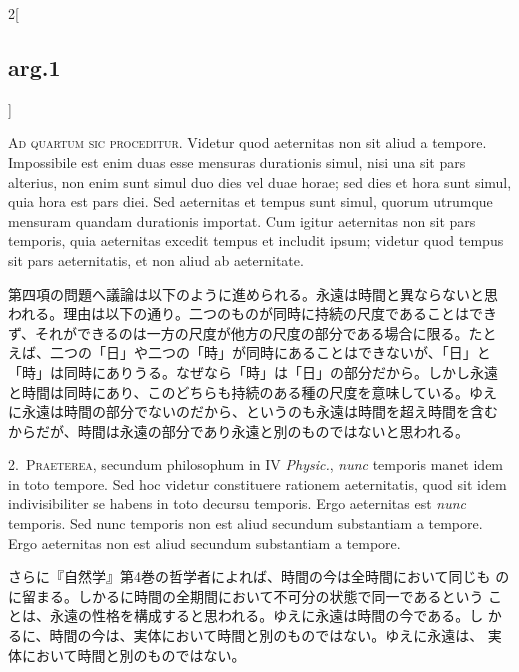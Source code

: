 \documentclass[paper=a4paper,fontsize=10pt,jafontsize=9pt,titlepage]{jlreq}
\begin{document}
{}
\setcounter{section}{4}
\setcounter{subsection}{0}

\begin{paracol}{2}[\subsection{arg.1}]

{\huge A}{\scshape d quartum sic proceditur}. Videtur quod aeternitas non sit aliud a
tempore. Impossibile est enim duas esse mensuras durationis simul, nisi
una sit pars alterius, non enim sunt simul duo dies vel duae horae; sed
dies et hora sunt simul, quia hora est pars diei. Sed aeternitas et
tempus sunt simul, quorum utrumque mensuram quandam durationis
importat. Cum igitur aeternitas non sit pars temporis, quia aeternitas
excedit tempus et includit ipsum; videtur quod tempus sit pars
aeternitatis, et non aliud ab aeternitate.

\switchcolumn

第四項の問題へ議論は以下のように進められる。永遠は時間と異ならないと思
われる。理由は以下の通り。二つのものが同時に持続の尺度であることはでき
ず、それができるのは一方の尺度が他方の尺度の部分である場合に限る。たと
えば、二つの「日」や二つの「時」が同時にあることはできないが、「日」と
「時」は同時にありうる。なぜなら「時」は「日」の部分だから。しかし永遠
と時間は同時にあり、このどちらも持続のある種の尺度を意味している。ゆえ
に永遠は時間の部分でないのだから、というのも永遠は時間を超え時間を含む
からだが、時間は永遠の部分であり永遠と別のものではないと思われる。


2.~{\scshape Praeterea}, secundum philosophum in IV {\itshape Physic.},
{\itshape nunc} temporis manet idem in toto tempore. Sed hoc videtur
constituere rationem aeternitatis, quod sit idem indivisibiliter se
habens in toto decursu temporis. Ergo aeternitas est {\itshape nunc}
temporis. Sed nunc temporis non est aliud secundum substantiam a
tempore. Ergo aeternitas non est aliud secundum substantiam a tempore.

\switchcolumn

さらに『自然学』第4巻の哲学者によれば、時間の今は全時間において同じも
のに留まる。しかるに時間の全期間において不可分の状態で同一であるという
ことは、永遠の性格を構成すると思われる。ゆえに永遠は時間の今である。し
かるに、時間の今は、実体において時間と別のものではない。ゆえに永遠は、
実体において時間と別のものではない。


\end{paracol}
\end{document}
